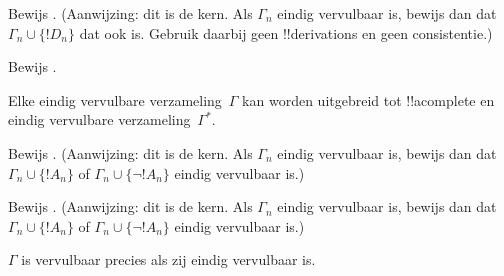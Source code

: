 \documentclass[../../../include/open-logic-section]{subfiles}
\begin{document}
\begin{prob}
Bewijs . (Aanwijzing: dit is de
kern. Als $\Gamma_n$ eindig vervulbaar is, bewijs dan dat $\Gamma_n
\cup \{!D_n\}$ dat ook is. Gebruik daarbij geen !!{derivation}s en geen
consistentie.)
\end{prob}
\tagendprob


\begin{prob}
Bewijs .
\end{prob}
\tagendprob

\begin{lem}
 Elke eindig vervulbare verzameling~$\Gamma$
kan worden uitgebreid tot !!a{complete} en eindig vervulbare
verzameling~$\Gamma^*$.
\end{lem}

\begin{prob}
Bewijs . (Aanwijzing: dit is de
kern. Als $\Gamma_n$ eindig vervulbaar is, bewijs dan dat
$\Gamma_n \cup \{!A_n\}$ of $\Gamma_n \cup \{\lnot !A_n\}$ eindig
vervulbaar is.)
\end{prob}
\tagendprob

\begin{prob}
Bewijs . (Aanwijzing: dit is de
kern. Als $\Gamma_n$ eindig vervulbaar is, bewijs dan dat
$\Gamma_n \cup \{!A_n\}$ of $\Gamma_n \cup \{\lnot !A_n\}$ eindig
vervulbaar is.)
\end{prob}
\tagendprob

\begin{thm}[Compactheid]
 $\Gamma$ is vervulbaar precies als zij
eindig vervulbaar is.
\end{thm}
\end{document}
